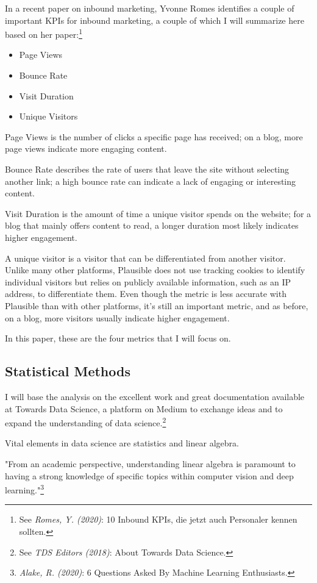 In a recent paper on inbound marketing, Yvonne Romes identifies a couple of important KPIs for inbound marketing, a couple of which I will summarize here based on her paper:\footnote{See \textit{Romes, Y. (2020)}: 10 Inbound KPIs, die jetzt auch Personaler kennen sollten.\cite{inboundKPI}}

\begin{itemize}
\item Page Views
\item Bounce Rate
\item Visit Duration
\item Unique Visitors
\end{itemize}

Page Views is the number of clicks a specific page has received; on a blog, more page views indicate more engaging content.

Bounce Rate describes the rate of users that leave the site without selecting another link; a high bounce rate can indicate a lack of engaging or interesting content.

Visit Duration is the amount of time a unique visitor spends on the website; for a blog that mainly offers content to read, a longer duration most likely indicates higher engagement.

A unique visitor is a visitor that can be differentiated from another visitor. Unlike many other platforms, Plausible does not use tracking cookies to identify individual visitors but relies on publicly available information, such as an IP address, to differentiate them. Even though the metric is less accurate with Plausible than with other platforms, it's still an important metric, and as before, on a blog, more visitors usually indicate higher engagement.

In this paper, these are the four metrics that I will focus on.

\subsection{Statistical Methods}

I will base the analysis on the excellent work and great documentation available at Towards Data Science, a platform on Medium to exchange ideas and to expand the understanding of data science.\footnote{See \textit{TDS Editors (2018)}: About Towards Data Science.\cite{aboutTDS}}

Vital elements in data science are statistics and linear algebra.

"From an academic perspective, understanding linear algebra is paramount to having a strong knowledge of specific topics within computer vision and deep learning."\footnote{\textit{Alake, R. (2020)}: 6 Questions Asked By Machine Learning Enthusiasts.\cite{sixQuestions}}

